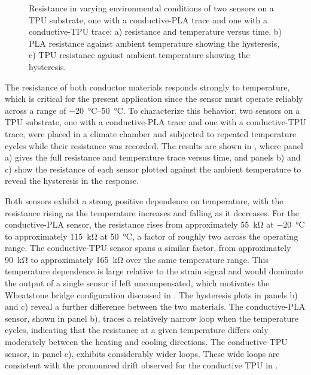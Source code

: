 \begin{figure}[!b]
\centering

    \caption{Resistance in varying environmental conditions of two sensors on a TPU substrate, one with a conductive-PLA trace and one with a conductive-TPU trace: a) resistance and temperature versus time, b) PLA resistance against ambient temperature showing the hysteresis, c) TPU resistance against ambient temperature showing the hysteresis.}
    \label{fig:TPUvsPLA_neg_deg}
\end{figure}

The resistance of both conductor materials responds strongly to temperature, which is critical for the present application since the sensor must operate reliably across a range of \SIrange{-20}{50}{\celsius}. To characterize this behavior, two sensors on a TPU substrate, one with a conductive-PLA trace and one with a conductive-TPU trace, were placed in a climate chamber and subjected to repeated temperature cycles while their resistance was recorded. The results are shown in , where panel a) gives the full resistance and temperature trace versus time, and panels b) and c) show the resistance of each sensor plotted against the ambient temperature to reveal the hysteresis in the response.

Both sensors exhibit a strong positive dependence on temperature, with the resistance rising as the temperature increases and falling as it decreases. For the conductive-PLA sensor, the resistance rises from approximately \SI{55}{\kilo\ohm} at \SI{-20}{\celsius} to approximately \SI{115}{\kilo\ohm} at \SI{50}{\celsius}, a factor of roughly two across the operating range. The conductive-TPU sensor spans a similar factor, from approximately \SI{90}{\kilo\ohm} to approximately \SI{165}{\kilo\ohm} over the same temperature range. This temperature dependence is large relative to the strain signal and would dominate the output of a single sensor if left uncompensated, which motivates the Wheatstone bridge configuration discussed in . 
The hysteresis plots in panels b) and c) reveal a further difference between the two materials. The conductive-PLA sensor, shown in panel b), traces a relatively narrow loop when the temperature cycles, indicating that the resistance at a given temperature differs only moderately between the heating and cooling directions. The conductive-TPU sensor, in panel c), exhibits considerably wider loops. These wide loops are consistent with the pronounced drift observed for the conductive TPU in .

